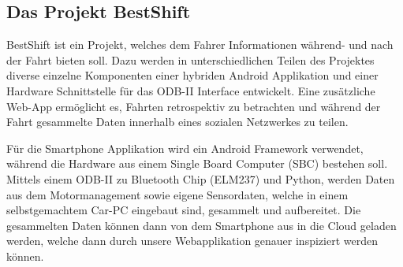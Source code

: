 \subsection{Das Projekt BestShift}

BestShift ist ein Projekt, welches dem Fahrer Informationen während- und nach der Fahrt bieten soll. 
Dazu werden in unterschiedlichen Teilen des Projektes 
diverse einzelne Komponenten einer hybriden Android Applikation und einer Hardware Schnittstelle für das ODB-II 
Interface entwickelt. 
Eine zusätzliche Web-App ermöglicht es, Fahrten retrospektiv zu betrachten und während der Fahrt gesammelte Daten innerhalb eines sozialen Netzwerkes zu teilen.
 

Für die Smartphone Applikation wird ein Android Framework verwendet, 
während die Hardware aus einem Single Board Computer (SBC) bestehen soll. 
Mittels einem ODB-II zu Bluetooth Chip (ELM237) und Python, 
werden Daten aus dem Motormanagement sowie eigene Sensordaten, welche in einem selbstgemachtem Car-PC eingebaut sind,
gesammelt und aufbereitet. 
Die gesammelten Daten können dann von dem Smartphone aus in die Cloud geladen werden, welche dann durch unsere
Webapplikation genauer inspiziert werden können.
\clearpage %